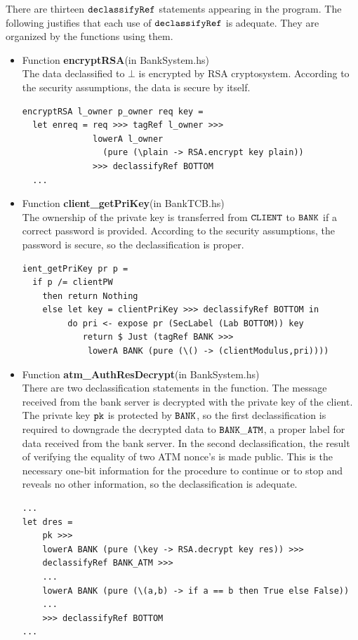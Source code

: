 \documentclass{report}
\newcommand{\co}[1]{$\cod{#1}$}
\begin{document}
There are thirteen \co{declassifyRef} statements appearing in the program. The following justifies that each use 
of \co{declassifyRef} is adequate. They are organized by the functions using them.
\begin{itemize}
\item Function \textbf{encryptRSA}(in BankSystem.hs) \\
      The data declassified to $\bot$ is encrypted by RSA cryptosystem. According to the security
      assumptions, the data is secure by itself.
\begin{Verbatim}[fontsize=\small]
encryptRSA l_owner p_owner req key =
  let enreq = req >>> tagRef l_owner >>> 
              lowerA l_owner 
                (pure (\plain -> RSA.encrypt key plain))
              >>> declassifyRef BOTTOM 
  ...
\end{Verbatim}

\item Function \textbf{client\_getPriKey}(in BankTCB.hs) \\
      The ownership of the private key is transferred from \co{CLIENT} to \co{BANK} if a correct password
      is provided. According to the security assumptions, the password is secure, so the declassification
      is proper.
\begin{Verbatim}[fontsize=\small]
ient_getPriKey pr p =
  if p /= clientPW
    then return Nothing
    else let key = clientPriKey >>> declassifyRef BOTTOM in
         do pri <- expose pr (SecLabel (Lab BOTTOM)) key
            return $ Just (tagRef BANK >>> 
             lowerA BANK (pure (\() -> (clientModulus,pri))))
\end{Verbatim}

\item Function \textbf{atm\_AuthResDecrypt}(in BankSystem.hs) \\
      There are two declassification statements in the function. The message received from the bank server is decrypted with
      the private key of the client. The private key \co{pk} is protected by \co{BANK}, so the first declassification 
      is required to downgrade the decrypted data to \co{BANK\_ATM}, a proper label for data received from the 
      bank server. In the second declassification, the result of verifying the equality of two ATM nonce's is made
      public. This is the necessary one-bit information for the procedure to continue or to stop and reveals no 
      other information, so the declassification is adequate.
\begin{Verbatim}[fontsize=\small]
...
let dres = 
    pk >>>
    lowerA BANK (pure (\key -> RSA.decrypt key res)) >>>
    declassifyRef BANK_ATM >>>
    ...
    lowerA BANK (pure (\(a,b) -> if a == b then True else False))
    ...
    >>> declassifyRef BOTTOM
...
\end{Verbatim}


\end{itemize}
\end{document}

